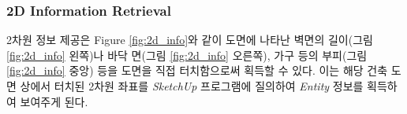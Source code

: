 

\subsubsection{2D Information Retrieval}
2차원 정보 제공은 Figure \ref{fig:2d_info}와 같이 도면에 나타난 벽면의 길이(그림 \ref{fig:2d_info} 왼쪽)나 바닥 면(그림 \ref{fig:2d_info} 오른쪽), 가구 등의 부피(그림 \ref{fig:2d_info} 중앙) 등을 도면을 직접 터치함으로써 획득할 수 있다. 이는 해당 건축 도면 상에서 터치된 2차원 좌표를 \textit{SketchUp} 프로그램에 질의하여 \textit{Entity} 정보를 획득하여 보여주게 된다.


